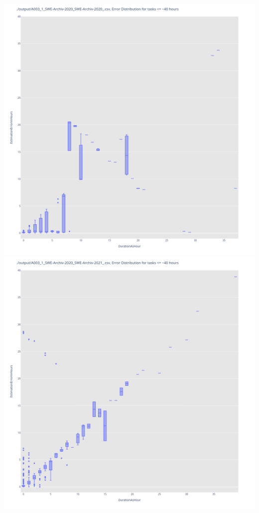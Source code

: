 \includegraphics[width=\textwidth]{Scripts/output/A003_1_SWE-Archiv-2020_SWE-Archiv-2020_.csv.error_distribution.png}
\includegraphics[width=\textwidth]{Scripts/output/A003_1_SWE-Archiv-2020_SWE-Archiv-2021_.csv.error_distribution.png}
